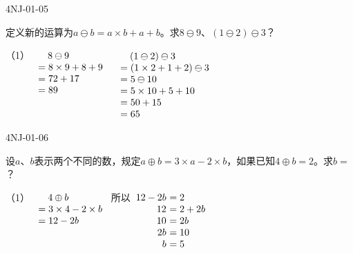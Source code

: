 \begin{defproblem}{4NJ-01-05}%
\begin{onlyproblem}%
定义新的运算为$a\ominus b=a\times b+a+b$。求$8\ominus 9$、$(1\ominus 2)\ominus 3$？

\end{onlyproblem}%
\begin{onlysolution}%
（1）$\begin{array}[t]{r@{~}l}
&\quad8\ominus 9\\
&=8\times9+8+9\\
&=72+17\\
&=89
\end{array}
$
\qquad
$\begin{array}[t]{r@{~}l}
&\quad (1\ominus 2)\ominus 3\\
&=(1\times 2+1+2)\ominus 3\\
&=5\ominus 10\\
&=5\times10+5+10\\
&=50+15\\
&=65\\
\end{array}
$

\end{onlysolution}%
\end{defproblem}






\begin{defproblem}{4NJ-01-06}%
\begin{onlyproblem}%
设$a$、$b$表示两个不同的数，规定$a\oplus b=3\times a-2\times b$，如果已知$4\oplus b=2$。求$b=$？
\end{onlyproblem}%
\begin{onlysolution}%
（1）$\begin{array}[t]{r@{~}l}
&\quad 4\oplus b\\
&=3\times4-2\times b\\
&=12-2b
\end{array}
$
\quad
所以$\begin{array}[t]{r@{~}l}
12-2b&=2\\
12&=2+2b\\
10&=2b\\
2b&=10\\
b&=5\\
\end{array}
$
\end{onlysolution}%
\end{defproblem}






